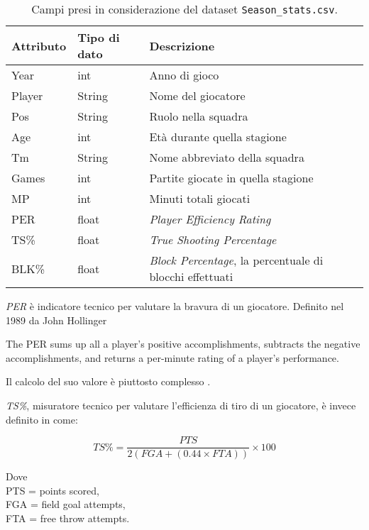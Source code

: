 \begin{center}
	\begin{longtable}[m]{|m{5em} m{7em} m{16em}|} 

		\caption{Campi presi in considerazione del dataset \texttt{Season\_stats.csv}.\label{long}}\\
		\hline
		\bfseries{Attributo} & \bfseries{Tipo di dato} & \bfseries{Descrizione} \\
		\hline

		Year & int & Anno di gioco\\ 
		\hline
		Player & String & Nome del giocatore\\ 
		\hline
		Pos & String & Ruolo nella squadra\\ 
		\hline
		Age & int & Età durante quella stagione\\ 
		\hline
		Tm & String & Nome abbreviato della squadra\\
		\hline
		Games & int & Partite giocate in quella stagione\\ 
		\hline
		MP & int & Minuti totali giocati\\ 
		\hline
		PER & float & \textit{Player Efficiency Rating}\\ 
		\hline
		TS\% & float & \textit{True Shooting Percentage}\\ 
		\hline
		BLK\% & float & \textit{Block Percentage}, la percentuale di blocchi effettuati \\ 
		\hline

	\end{longtable}
\end{center}
\textit{PER} è indicatore tecnico per valutare la bravura di un giocatore. Definito nel 1989 da John Hollinger
\begin{displayquote}
 The PER sums up all a player's positive accomplishments, subtracts the negative accomplishments, and returns a per-minute rating of a player's performance. 
 \end{displayquote}
Il calcolo del suo valore è piuttosto complesso \cite{BRper}.
\par
\textit{TS\%}, misuratore tecnico per valutare l’efficienza di tiro di un giocatore, è invece definito in \cite{BRglossary} come:

$$TS\% = \frac{PTS}{ 2(FGA + (0.44 \times FTA))}\times100$$

Dove \\
PTS = points scored,\\
FGA = field goal attempts,\\
FTA = free throw attempts. \\

